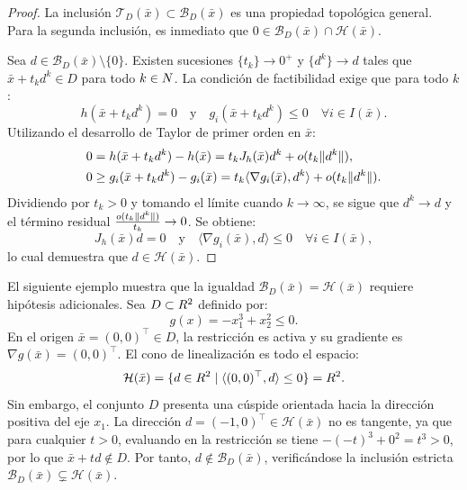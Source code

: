 \begin{proof}
 La inclusión $\mathcal{T}_D(\bar{x}) \subset \mathcal{B}_D(\bar{x})$ es una propiedad topológica general. Para la segunda inclusión, es inmediato que $0 \in \mathcal{B}_D(\bar{x}) \cap \mathcal{H}(\bar{x})$.
 
 Sea $d \in \mathcal{B}_D(\bar{x}) \setminus \{0\}$. Existen sucesiones $\{t_k\} \to 0^+$ y $\{d^k\} \to d$ tales que $\bar{x} + t_k d^k \in D$ para todo $k \in N$. La condición de factibilidad exige que para todo $k$:
 \[
 h(\bar{x} + t_k d^k) = 0 \quad \text{y} \quad g_i(\bar{x} + t_k d^k) \le 0 \quad \forall i \in I(\bar{x}).
 \]
 Utilizando el desarrollo de Taylor de primer orden en $\bar{x}$:
 \begin{align*}
 0 &= h(\bar{x} + t_k d^k) - h(\bar{x}) = t_k J_h(\bar{x}) d^k + o(t_k \lVert d^k\rVert), \\
 0 &\ge g_i(\bar{x} + t_k d^k) - g_i(\bar{x}) = t_k \langle \nabla g_i(\bar{x}), d^k \rangle + o(t_k \lVert d^k\rVert).
 \end{align*}
 Dividiendo por $t_k > 0$ y tomando el límite cuando $k \to \infty$, se sigue que $d^k \to d$ y el término residual $\frac{o(t_k \lVert d^k\rVert)}{t_k} \to 0$. Se obtiene:
 \[
 J_h(\bar{x}) d = 0 \quad \text{y} \quad \langle \nabla g_i(\bar{x}), d \rangle \le 0 \quad \forall i \in I(\bar{x}),
 \]
 lo cual demuestra que $d \in \mathcal{H}(\bar{x})$.
\end{proof}

\begin{counterexample}\label{v1:exa:falla_inclusion_mixta}
 El siguiente ejemplo muestra que la igualdad $\mathcal{B}_D(\bar{x}) = \mathcal{H}(\bar{x})$ requiere hipótesis adicionales. Sea $D \subset R^2$ definido por:
 \[
 g(x) = -x_1^3 + x_2^2 \le 0.
 \]
 En el origen $\bar{x} = (0,0)^\top \in D$, la restricción es activa y su gradiente es $\nabla g(\bar{x}) = (0,0)^\top$. El cono de linealización es todo el espacio:
 \[
 \mathcal{H}(\bar{x}) = \{ d \in R^2 \mid \langle (0,0)^\top, d \rangle \le 0 \} = R^2.
 \]
 Sin embargo, el conjunto $D$ presenta una cúspide orientada hacia la dirección positiva del eje $x_1$. La dirección $d = (-1, 0)^\top \in \mathcal{H}(\bar{x})$ no es tangente, ya que para cualquier $t > 0$, evaluando en la restricción se tiene $-(-t)^3 + 0^2 = t^3 > 0$, por lo que $\bar{x} + td \notin D$. Por tanto, $d \notin \mathcal{B}_D(\bar{x})$, verificándose la inclusión estricta $\mathcal{B}_D(\bar{x}) \subsetneq \mathcal{H}(\bar{x})$.
\end{counterexample}


